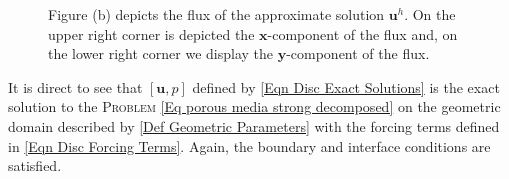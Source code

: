 \documentclass[3p]{elsarticle}
\def\u{\mathbf u}
\def\jversor{\widehat{\boldsymbol{\jmath} } }
\begin{document}
\begin{example}
\begin{figure}[h]
{	Figure (b) depicts the flux of the approximate solution $\u^{h}$. On the upper right corner is depicted the $\boldsymbol{x}$-component of the flux and, on the lower right corner we display %
	the $\boldsymbol{y}$-component of the flux. 
	\label{Fig Disc Approximate Solution Numerical Example} }
\end{figure}
%
%
It is direct to see that $[\u, p]$ defined by \eqref{Eqn Disc Exact Solutions}
is the exact solution to the \textsc{Problem} \eqref{Eq porous media strong decomposed} on the geometric domain described by \eqref{Def Geometric Parameters} with the forcing terms defined in \eqref{Eqn Disc Forcing Terms}. Again, the boundary and interface conditions are satisfied.


\end{example}
\end{document}
